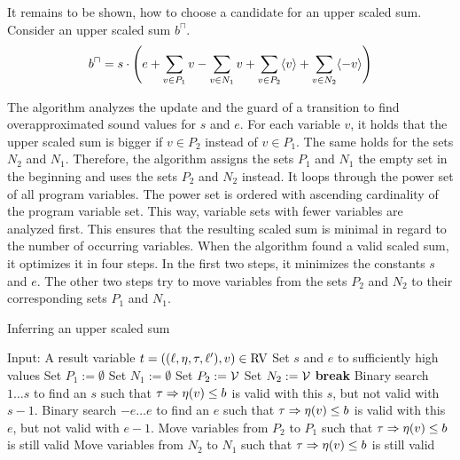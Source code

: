 It remains to be shown, how to choose a candidate for an upper scaled sum.
Consider an upper scaled sum $b^\sqcap$.
\[ b^\sqcap = s \cdot \left(
e
+ \sum_{v \in P_1} v
- \sum_{v \in N_1} v
+ \sum_{v \in P_2} \langle v\rangle
+ \sum_{v \in N_2} \langle-v\rangle
\right)
\]

The algorithm analyzes the update and the guard of a transition to find overapproximated sound values for $s$ and $e$.
For each variable $v$, it holds that the upper scaled sum is bigger if $v \in P_2$ instead of $v \in P_1$.
The same holds for the sets $N_2$ and $N_1$.
Therefore, the algorithm assigns the sets $P_1$ and $N_1$ the empty set in the beginning and uses the sets $P_2$ and $N_2$ instead. 
It loops through the power set of all program variables.
The power set is ordered with ascending cardinality of the program variable set.
This way, variable sets with fewer variables are analyzed first.
This ensures that the resulting scaled sum is minimal in regard to the number of occurring variables.
When the algorithm found a valid scaled sum, it optimizes it in four steps.
In the first two steps, it minimizes the constants $s$ and $e$.
The other two steps try to move variables from the sets $P_2$ and $N_2$ to their corresponding sets $P_1$ and $N_1$.

\begin{algorithm}
\caption{Inferring an upper scaled sum}\label{ulsb_algorithm}
\begin{algorithmic}[1]
  \State Input: A result variable $t = ((\ell,\eta,\tau,\ell'),v) \in \text{RV}$
  \State Set $s$ and $e$ to sufficiently high values
  \State Set $P_1 := \emptyset$
  \State Set $N_1 := \emptyset$
    \State Set $P_2 := \mathcal{V}$
    \State Set $N_2 := \mathcal{V}$
      \State \textbf{break}
    \EndIf
  \EndFor
  \State Binary search $1 \dots s$ to find an $s$ such that $\tau \Rightarrow \eta(v) \leq b$ is valid with this $s$, but not valid with $s-1$.
  \State Binary search $-e \dots e$ to find an $e$ such that $\tau \Rightarrow \eta(v) \leq b$ is valid with this $e$, but not valid with $e-1$.
  \State Move variables from $P_2$ to $P_1$ such that $\tau \Rightarrow \eta(v) \leq b$ is still valid
  \State Move variables from $N_2$ to $N_1$ such that $\tau \Rightarrow \eta(v) \leq b$ is still valid
\end{algorithmic}
\end{algorithm}

